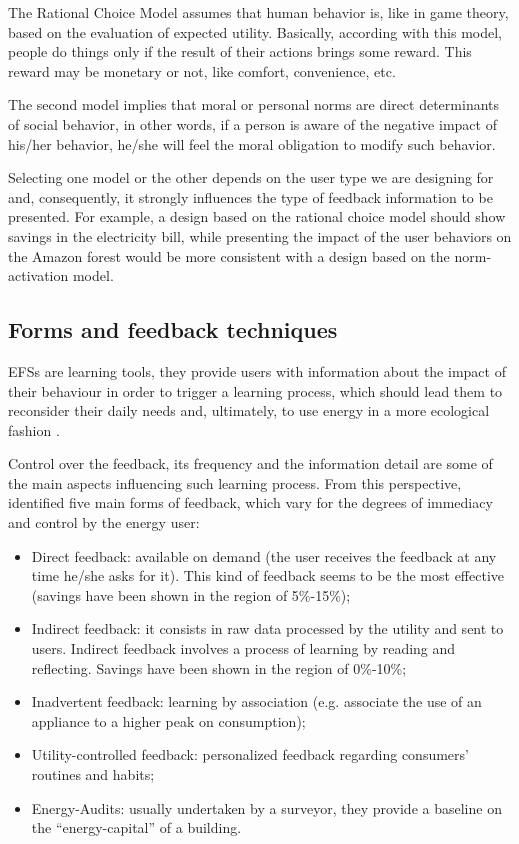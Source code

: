 The Rational Choice Model assumes that human behavior is, like in game theory, based on the evaluation of expected utility. Basically, according with this model, people do things only if the result of their actions brings some reward. This reward may be monetary or not, like comfort, convenience, etc.


The second model implies that moral or personal norms are direct determinants of social behavior, in other words, if a person is aware of the negative impact of his/her behavior, he/she will feel the moral obligation to modify such behavior.


Selecting one model or the other depends on the user type we are designing for and, consequently, it strongly influences the type of feedback information to be presented. For example, a design based on the rational choice model should show savings in the electricity bill, while presenting the impact of the user behaviors on the Amazon forest would be more consistent with a design based on the norm-activation model.

\subsection{Forms and feedback techniques}

\acp{EFS} are learning tools, they provide users with information about the impact of their behaviour in order to trigger a learning process, which should lead them to reconsider their daily needs and, ultimately, to use energy in a more ecological fashion \cite{DesigningFeedback}.


Control over the feedback, its frequency and the information detail are some of the main aspects influencing such learning process. From this perspective, \cite{Darby2006, DesigningFeedback} identified five main forms of feedback, which vary for the degrees of immediacy and control by the energy user:

\begin{itemize}
    \item Direct feedback: available on demand (the user receives the feedback at any time he/she asks for it). This kind of feedback seems to be the most effective (savings have been shown in the region of 5\%-15\%);
    \item Indirect feedback: it consists in raw data processed by the utility and sent to users. Indirect feedback involves a process of learning by reading and reflecting. Savings have been shown in the region of 0\%-10\%;
    \item Inadvertent feedback: learning by association (e.g. associate the use of an appliance to a higher peak on consumption);
    \item Utility-controlled feedback: personalized feedback regarding consumers’ routines and habits;
    \item  Energy-Audits: usually undertaken by a surveyor, they provide a baseline on the “energy-capital” of a building.
\end{itemize}

